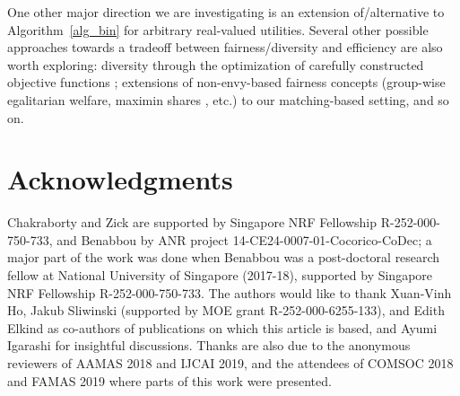 \documentclass[11pt,dvipdfmx]{article}
\begin{document}
One other major direction we are investigating is an extension of/alternative to Algorithm~\ref{alg_bin} for arbitrary real-valued utilities. Several other possible approaches towards a tradeoff between fairness/diversity and efficiency are also worth exploring: diversity through the optimization of carefully constructed objective functions \cite{lang2016multi, ahmed2017diverse}; extensions of non-envy-based fairness concepts (group-wise egalitarian welfare, maximin shares \cite{barman2017approx,barman2018groupwise}, etc.) to our matching-based setting, and so on. 

\section*{Acknowledgments}\label{sec:acks}
Chakraborty and Zick are supported by Singapore NRF Fellowship R-252-000-750-733, and Benabbou by ANR project 14-CE24-0007-01-Cocorico-CoDec; a major part of the work was done when Benabbou was a post-doctoral research fellow at National University of Singapore (2017-18), supported by Singapore NRF Fellowship R-252-000-750-733. 
The authors would like to thank Xuan-Vinh Ho, Jakub Sliwinski (supported by MOE grant R-252-000-6255-133), and Edith Elkind as co-authors of publications on which this article is based, and Ayumi Igarashi for insightful discussions.
Thanks are also due to the anonymous reviewers of AAMAS 2018 and IJCAI 2019, and the attendees of COMSOC 2018 and FAMAS 2019 where parts of this work were presented. 
\end{document}
